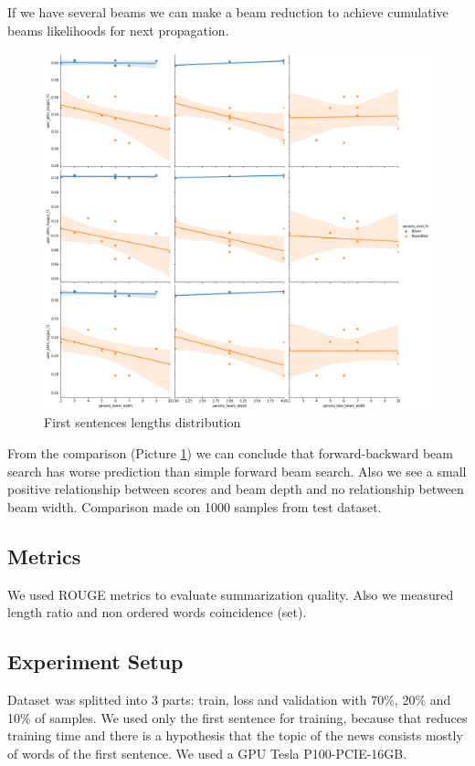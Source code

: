 \documentclass{article}
\begin{document}
If we have several beams we can make a beam reduction to achieve cumulative beams likelihoods for next propagation. 

\begin{figure}[H]
    \centering
    \includegraphics[width=1.0\linewidth]{beam.png}
    \caption{First sentences lengths distribution}
    \label{fig:beam}
\end{figure}

From the comparison (Picture \ref{fig:beam}) we can conclude that forward-backward beam search has worse prediction than simple forward beam search. Also we see a small positive relationship between scores and beam depth and no relationship between beam width. Comparison made on 1000 samples from test dataset.


\subsection{Metrics}
We used ROUGE metrics to evaluate summarization quality. Also we measured length ratio and non ordered words coincidence (set).

\subsection{Experiment Setup}

Dataset was splitted into 3 parts: train, loss and validation with 70\%, 20\% and 10\% of samples. We used only the first sentence for training, because that reduces training time and there is a hypothesis that the topic of the news consists mostly of words of the first sentence. We used a GPU Tesla P100-PCIE-16GB.
\end{document}
